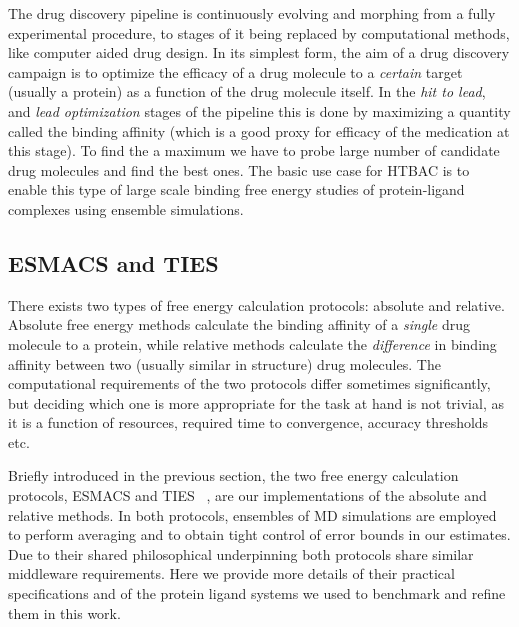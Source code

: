 
The drug discovery pipeline is continuously evolving and morphing from a fully 
experimental procedure, to stages of it being replaced by computational 
methods, like computer aided drug design. In its simplest form, the aim of a 
drug discovery campaign is to optimize the efficacy of a drug molecule to a 
\emph{certain} target (usually a protein) as a function of the drug molecule 
itself. In the \emph{hit to lead}, and \emph{lead optimization} stages of the 
pipeline this is done by maximizing a quantity called the binding affinity 
(which is a good proxy for efficacy of the medication at this stage). To find 
the a maximum we have to probe large number of candidate drug molecules and 
find the best ones. The basic use case for HTBAC is to enable this type of 
large scale binding free energy studies of protein-ligand complexes using 
ensemble simulations. 

\subsection{ESMACS and TIES}


There exists two types of free energy calculation protocols: absolute and 
relative. Absolute free energy methods calculate the binding affinity of a 
\emph{single} drug molecule to a protein, while relative methods calculate the 
\emph{difference} in binding affinity between two (usually similar in 
structure) drug molecules. The computational requirements of the two protocols 
differ sometimes significantly, but deciding which one is more appropriate for 
the task at hand is not trivial, as it is a function of resources, required 
time to convergence, accuracy thresholds etc.

Briefly introduced in the previous section, the two free energy calculation 
protocols, ESMACS and TIES ~\cite{Wan2017brd4, Bhati2017}, are our 
implementations of the absolute and relative methods. 
In both protocols, ensembles of MD simulations are employed to perform 
averaging and to obtain tight control of error bounds in our estimates.
Due to their shared philosophical underpinning both protocols share similar 
middleware requirements.
Here we provide more 
details of their practical specifications and of the protein ligand systems we 
used to benchmark and refine them in this work.

